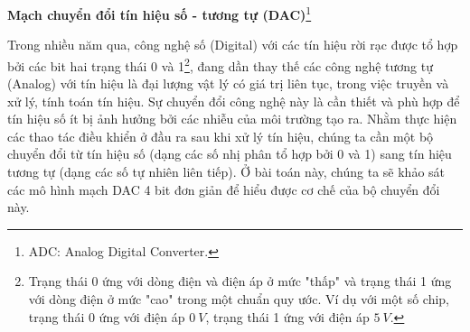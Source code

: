 \textbf{Mạch chuyển đổi tín hiệu số - tương tự (DAC)}\footnote{ADC: Analog Digital Converter.}

Trong nhiều năm qua, công nghệ số (Digital) với các tín hiệu rời rạc được tổ hợp bởi các bit hai trạng thái 0 và 1\footnote{Trạng thái 0 ứng với dòng điện và điện áp ở mức "thấp" và trạng thái 1 ứng với dòng điện ở mức "cao" trong một chuẩn quy ước. Ví dụ với một số chip, trạng thái 0 ứng với điện áp \( \SI{0}{V} \), trạng thái 1 ứng với điện áp \( \SI{5}{V} \).}, đang dần thay thế các công nghệ tương tự (Analog) với tín hiệu là đại lượng vật lý có giá trị liên tục, trong việc truyền và xử lý, tính toán tín hiệu. Sự chuyển đổi công nghệ này là cần thiết và phù hợp để tín hiệu số ít bị ảnh hưởng bởi các nhiễu của môi trường tạo ra. Nhằm thực hiện các thao tác điều khiển ở đầu ra sau khi xử lý tín hiệu, chúng ta cần một bộ chuyển đổi từ tín hiệu số (dạng các số nhị phân tổ hợp bởi 0 và 1) sang tín hiệu tương tự (dạng các số tự nhiên liên tiếp). Ở bài toán này, chúng ta sẽ khảo sát các mô hình mạch DAC 4 bit đơn giản để hiểu được cơ chế của bộ chuyển đổi này.

